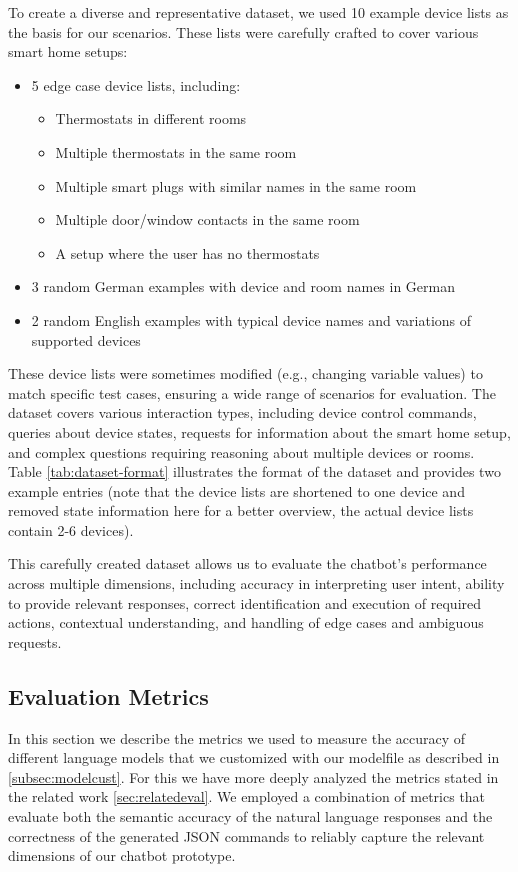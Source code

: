 To create a diverse and representative dataset, we used 10 example device lists as the basis for our scenarios. These lists were carefully crafted to cover various smart home setups:

\begin{itemize}
    \item 5 edge case device lists, including:
    \begin{itemize}
    \item Thermostats in different rooms
    \item Multiple thermostats in the same room
    \item Multiple smart plugs with similar names in the same room
    \item Multiple door/window contacts in the same room
    \item A setup where the user has no thermostats
    \end{itemize}
    \item 3 random German examples with device and room names in German
    \item 2 random English examples with typical device names and variations of supported devices
\end{itemize}

These device lists were sometimes modified (e.g., changing variable values) to match specific test cases, ensuring a wide range of scenarios for evaluation.
The dataset covers various interaction types, including device control commands, queries about device states, requests for information about the smart home setup, and complex questions requiring reasoning about multiple devices or rooms.
Table \ref{tab:dataset-format} illustrates the format of the dataset and provides two example entries (note that the device lists are shortened to one device and removed state information here for a better overview, the actual device lists contain 2-6 devices).

This carefully created dataset allows us to evaluate the chatbot's performance across multiple dimensions, including accuracy in interpreting user intent, ability to provide relevant responses, correct identification and execution of required actions, contextual understanding, and handling of edge cases and ambiguous requests.


\subsection{Evaluation Metrics}
In this section we describe the metrics we used to measure the accuracy of different language models that we customized with our modelfile as described in \cref{subsec:modelcust}.
For this we have more deeply analyzed the metrics stated in the related work \cref{sec:relatedeval}.
We employed a combination of metrics that evaluate both the semantic accuracy of the natural language responses and the correctness of the generated JSON commands to reliably capture the relevant dimensions of our chatbot prototype.

